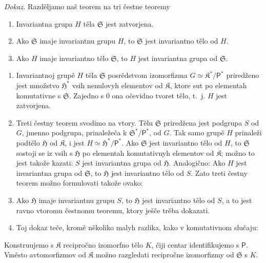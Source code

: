 \documentclass[11pt]{article}
\begin{document}
\emph{Dokaz.} Razděljamo naš teorem na tri čestne teoremy
\begin{enumerate}
\item Invariantna grupa \(H\) těla \(\mathfrak S\) jest zatvorjena.
\item Ako \(\mathfrak S\) imaje invariantnu grupu \(H\), to \(\mathfrak S\) jest invariantno tělo od \(H\).
\item Ako \(H\) imaje invariantno tělo \(\mathfrak S\), to \(H\) jest invariantna grupa od \(\mathfrak S\).
\end{enumerate}

\begin{enumerate}
\item Invariantnoj grupě \(H\) těla \(\mathfrak S\) posrědstvom izomorfizma \(G\simeq \mathfrak K^*/\mathsf P^*\) priredženo jest množstvo \(\mathfrak H^*\) vsih nenulovyh elementov od \(\mathfrak K\), ktore sut po elementah komutativne s \(\mathfrak S\). Zajedno s 0 ona očevidno tvoret tělo, t.~j. \(H\) jest zatvorjena.

\item Treti čestny teorem svodimo na vtory. Tělu \(\mathfrak S\) priredžena jest podgrupa \(S\) od \(G\), jmenno podgrupa, prinaležeča k \(\mathfrak S^*/\mathsf P^*\), od \(G\). Tak samo grupě \(H\) prinaleži podtělo \(\mathfrak H\) od \(\mathfrak K\), i jest \(H\simeq \mathfrak H^*/\mathsf P^*\). Ako \(\mathfrak S\) jest invariantno tělo od \(H\), to \(\mathfrak S\) sostoji se iz vsih s \(\mathfrak H\) po elementah komutativnyh elementov od \(\mathfrak K\); možno to jest takože kazati: \(S\) jest invariantna grupa od \(\mathfrak H\). Analogično: Ako \(H\) jest invariantna grupa od \(\mathfrak S\), to \(\mathfrak H\) jest invariantno tělo od \(S\). Zato treti čestny teorem možno formulovati takože ovako:

\item[\(3'\).] Ako \(\mathfrak H\) imaje invariantnu grupu \(S\), to \(\mathfrak H\) jest invariantno tělo od \(S\), a to jest ravno vtoromu čestnomu teoremu, ktory ješče trěba dokazati.

\item[3.] Toj dokaz teče, kromě několiko malyh razlika, kako v komutativnom slučaju:
\end{enumerate}

Konstruujemo s \(\mathfrak K\) recipročno izomorfno tělo \(K\), čiji centar identifikujemo s \(\mathsf P\). Vměsto avtomorfizmov od \(\mathfrak K\) možno razgledati recipročne izomorfizmy od \(\mathfrak S\) s \(K\).
\end{document}
